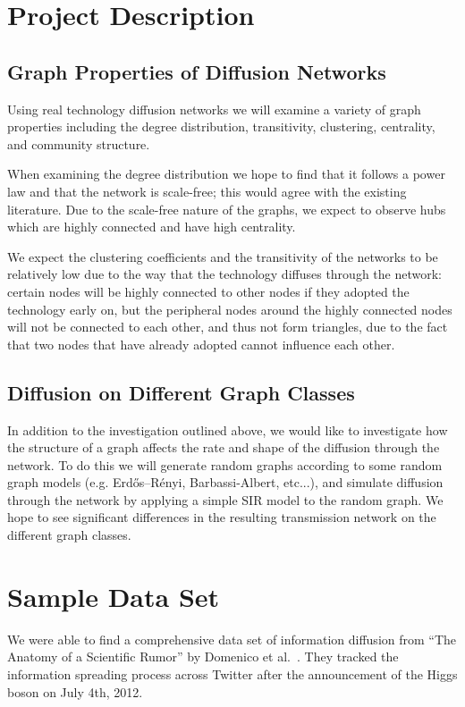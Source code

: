 \documentclass[12pt, oneside, openany]{article} %
\begin{document}
\section{Project Description}
\subsection{Graph Properties of Diffusion Networks}
Using real technology diffusion networks we will examine a variety of graph properties including the degree distribution, transitivity, clustering, centrality, and community structure.

When examining the degree distribution we hope to find that it follows a power law and that the network is scale-free; this would agree with the existing literature. Due to the scale-free nature of the graphs, we expect to observe hubs which are highly connected and have high centrality.

We expect the clustering coefficients and the transitivity of the networks to be relatively low due to the way that the technology diffuses through the network: certain nodes will be highly connected to other nodes if they adopted the technology early on, but the peripheral nodes around the highly connected nodes will not be connected to each other, and thus not form triangles, due to the fact that two nodes that have already adopted cannot influence each other.

\subsection{Diffusion on Different Graph Classes}
In addition to the investigation outlined above, we would like to investigate how the structure of a graph affects the rate and shape of the diffusion through the network. To do this we will generate random graphs according to some random graph models (e.g. Erdős–Rényi, Barbassi-Albert, etc...), and simulate diffusion through the network by applying a simple SIR model to the random graph. We hope to see significant differences in the resulting transmission network on the different graph classes.

\section{Sample Data Set}
We were able to find a comprehensive data set of information diffusion from ``The Anatomy of a Scientific Rumor'' by Domenico et al.~\cite{domenico}. They tracked the information spreading process across Twitter after the announcement of the Higgs boson on July 4th, 2012.
\end{document}

